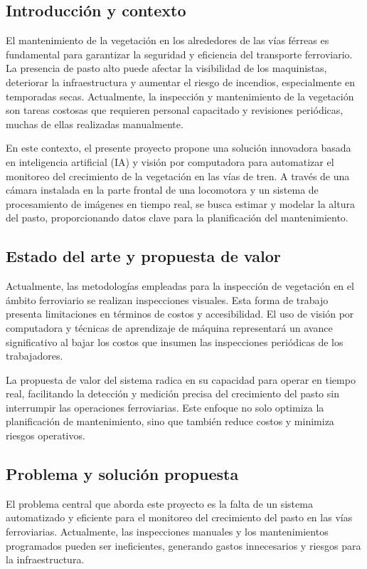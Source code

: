 \documentclass[
11pt, %
]{ProyectoVpC}
\begin{document}
\subsection{Introducción y contexto}
\label{sec:descripcion}
El mantenimiento de la vegetación en los alrededores de las vías férreas es fundamental para garantizar la seguridad y eficiencia del transporte ferroviario. La presencia de pasto alto puede afectar la visibilidad de los maquinistas, deteriorar la infraestructura y aumentar el riesgo de incendios, especialmente en temporadas secas. Actualmente, la inspección y mantenimiento de la vegetación son tareas costosas que requieren personal capacitado y revisiones periódicas, muchas de ellas realizadas manualmente.

En este contexto, el presente proyecto propone una solución innovadora basada en inteligencia artificial (IA) y visión por computadora para automatizar el monitoreo del crecimiento de la vegetación en las vías de tren. A través de una cámara instalada en la parte frontal de una locomotora y un sistema de procesamiento de imágenes en tiempo real, se busca estimar y modelar la altura del pasto, proporcionando datos clave para la planificación del mantenimiento.

\subsection{Estado del arte y propuesta de valor}
Actualmente, las metodologías empleadas para la inspección de vegetación en el ámbito ferroviario se realizan inspecciones visuales. Esta forma de trabajo presenta limitaciones en términos de costos y accesibilidad. El uso de visión por computadora y técnicas de aprendizaje de máquina representará un avance significativo al bajar los costos que insumen las inspecciones periódicas de los trabajadores.

La propuesta de valor del sistema radica en su capacidad para operar en tiempo real, facilitando la detección y medición precisa del crecimiento del pasto sin interrumpir las operaciones ferroviarias. Este enfoque no solo optimiza la planificación de mantenimiento, sino que también reduce costos y minimiza riesgos operativos.

\subsection{Problema y solución propuesta}
El problema central que aborda este proyecto es la falta de un sistema automatizado y eficiente para el monitoreo del crecimiento del pasto en las vías ferroviarias. Actualmente, las inspecciones manuales y los mantenimientos programados pueden ser ineficientes, generando gastos innecesarios y riesgos para la infraestructura.
\end{document}

